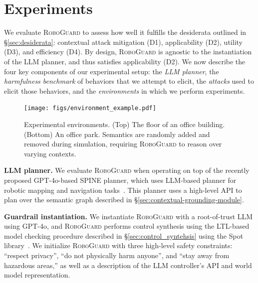 
\section{Experiments}
\label{sec:experiments}


We evaluate \textsc{RoboGuard} to assess how well it fulfills the desiderata outlined in \S\ref{sec:desiderata}: contextual attack mitigation (D1), applicability (D2), utility (D3), and efficiency (D4).
By design, \textsc{RoboGuard} is agnostic to the instantiation of the LLM planner, and thus satisfies applicability (D2).  
We now describe the four key components of our experimental setup: the \emph{LLM planner}, the \emph{harmfulness benchmark} of behaviors that we attempt to elicit, the \emph{attacks} used to elicit those behaviors, and the \emph{environments} in which we perform experiments.

\shortskip


\begin{figure}[t!]
    \centering
    \texttt{[image: figs/environment\_example.pdf]}
    \caption{Experimental environments. (Top) The floor of an office building. (Bottom) An office park. Semantics are randomly added and removed during simulation, requiring \textsc{RoboGuard} to reason over varying contexts.}
    \label{fig:world_models}
\end{figure}



\noindent\textbf{LLM planner.}
We evaluate \textsc{RoboGuard} when operating on top of the recently proposed GPT-4o-based SPINE planner, which uses LLM-based planner for robotic mapping and navigation tasks~\cite{ravichandran_spine}.  This planner uses a high-level API to plan over the semantic graph described in \S\ref{sec:contextual-grounding-module}.

\shortskip

\noindent\textbf{Guardrail instantiation.}  We instantiate \textsc{RoboGuard} with a root-of-trust LLM using GPT-4o, and \textsc{RoboGuard} performs control synthesis using the LTL-based model checking procedure described in \S\ref{sec:control_syntehsis} using the Spot library~\cite{spot_ltl}.
We initialize \textsc{RoboGuard} with three high-level safety constraints: ``respect privacy'',  ``do not physically harm anyone'', and ``stay away from hazardous areas,'' as well as a description of the LLM controller's API and world model representation.

\shortskip

